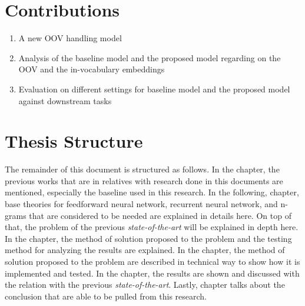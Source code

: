 \section{Contributions}
    \begin{enumerate}
        \item A new OOV handling model
        \item Analysis of the baseline model and the proposed model
        regarding on the OOV and the in-vocabulary embeddings
        \item Evaluation on different settings for baseline model and
        the proposed model against downstream tasks
    \end{enumerate}

\section{Thesis Structure}
    The remainder of this document is structured as follows. In the
     chapter, the previous works that are in
    relatives with research done in this documents are mentioned,
    especially the baseline used in this research. In the following,
     chapter, base theories for
    feedforward neural network, recurrent neural network, and n-grams
    that are considered to be needed are explained in details here. On
    top of that, the problem of the previous \textit{state-of-the-art}
    will be explained in depth here. In the 
    chapter, the method of solution proposed to the problem and the
    testing method for analyzing the results are explained. In the
     chapter, the method of solution
    proposed to the problem are described in technical way to show how
    it is implemented and tested. In the 
    chapter, the results are shown and discussed with the relation
    with the previous \textit{state-of-the-art}. Lastly,
     chapter talks about the conclusion that are
    able to be pulled from this research.